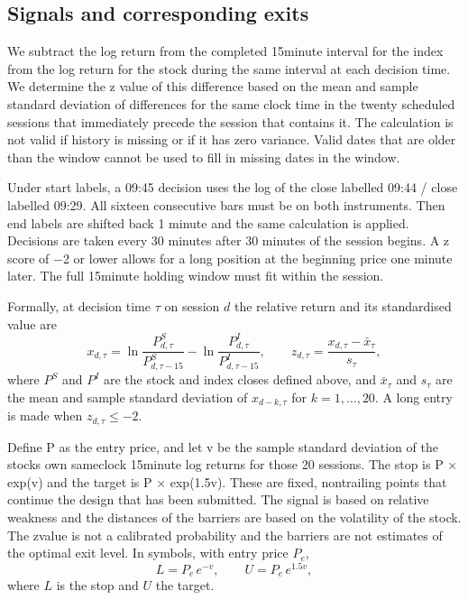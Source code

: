 \documentclass[11pt,a4paper]{article}
\begin{document}
\subsection*{Signals and corresponding exits}

We subtract the log return from the completed 15\allowbreak{}minute interval for the index from the log return for the stock during the same interval at each decision time. We determine the z value of this difference based on the mean and sample standard deviation of differences for the same clock time in the twenty scheduled sessions that immediately precede the session that contains it. The calculation is not valid if history is missing or if it has zero variance. Valid dates that are older than the window cannot be used to fill in missing dates in the window.

Under start labels, a 09:45 decision uses the log of the close labelled 09:44 / close labelled 09:29. All sixteen consecutive bars must be on both instruments. Then end labels are shifted back 1 minute and the same calculation is applied. Decisions are taken every 30 minutes after 30 minutes of the session begins. A z score of −2 or lower allows for a long position at the beginning price one minute later. The full 15\allowbreak{}minute holding window must fit within the session.

Formally, at decision time $\tau$ on session $d$ the relative return and its standardised value are
\begin{equation}
x_{d,\tau} = \ln\frac{P^{S}_{d,\tau}}{P^{S}_{d,\tau-15}} - \ln\frac{P^{I}_{d,\tau}}{P^{I}_{d,\tau-15}}, \qquad
z_{d,\tau} = \frac{x_{d,\tau} - \bar{x}_{\tau}}{s_{\tau}},
\end{equation}
where $P^{S}$ and $P^{I}$ are the stock and index closes defined above, and $\bar{x}_{\tau}$ and $s_{\tau}$ are the mean and sample standard deviation of $x_{d-k,\tau}$ for $k = 1,\dots,20$. A long entry is made when $z_{d,\tau} \le -2$.

Define P as the entry price, and let v be the sample standard deviation of the stocks own same\allowbreak{}clock 15\allowbreak{}minute log returns for those 20 sessions. The stop is P × exp(\allowbreak{}v) and the target is P × exp(1.5v). These are fixed, non\allowbreak{}trailing points that continue the design that has been submitted. The signal is based on relative weakness and the distances of the barriers are based on the volatility of the stock. The z\allowbreak{}value is not a calibrated probability and the barriers are not estimates of the optimal exit level.
In symbols, with entry price $P_e$,
\begin{equation}
L = P_e\, e^{-v}, \qquad U = P_e\, e^{1.5v},
\end{equation}
where $L$ is the stop and $U$ the target.
\end{document}
